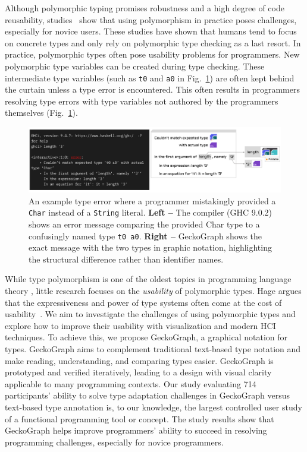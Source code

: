 Although polymorphic typing promises robustness and a high degree of code reusability, studies~\cite{Jun2000-ec, Jun2000-yu} show that using polymorphism in practice poses challenges, especially for novice users. These studies have shown that humans tend to focus on concrete types and only rely on polymorphic type checking as a last resort. In practice, polymorphic types often pose usability problems for programmers. New polymorphic type variables can be created during type checking. These intermediate type variables (such as \texttt{t0} and \texttt{a0} in Fig.~\ref{fig:example-foldable}) are often kept behind the curtain unless a type error is encountered. This often results in programmers resolving type errors with type variables not authored by the programmers themselves (Fig.~\ref{fig:example-foldable}).


\begin{figure}[hbt]
  \includegraphics[width=\linewidth]{figures/Foldable}
  \caption[Comparison between GeckoGraph and compiler error message]{\label{fig:example-foldable} An example type error where a programmer mistakingly provided a \texttt{Char} instead of a \texttt{String} literal. \textbf{Left --} The compiler (GHC 9.0.2) shows an error message comparing the provided Char type to a confusingly named type \texttt{t0 a0}. \textbf{Right --} GeckoGraph shows the exact message with the two types in graphic notation, highlighting the structural difference rather than identifier names.}
\end{figure}


While type polymorphism is one of the oldest topics in programming language theory \cite{Cardelli1987-fp}, little research focuses on the \textit{usability} of polymorphic types. Hage argues that the expressiveness and power of type systems often come at the cost of usability~\cite{Hage2020-hg}. We aim to investigate the challenges of using polymorphic types and explore how to improve their usability with visualization and modern HCI techniques. To achieve this, we propose GeckoGraph, a graphical notation for types. GeckoGraph aims to complement traditional text-based type notation and make reading, understanding, and comparing types easier. GeckoGraph is prototyped and verified iteratively, leading to a design with visual clarity applicable to many programming contexts. Our study evaluating 714 participants' ability to solve type adaptation challenges in GeckoGraph versus text-based type annotation is, to our knowledge, the largest controlled user study of a functional programming tool or concept. The study results show that GeckoGraph helps improve programmers' ability to succeed in resolving programming challenges, especially for novice programmers.


